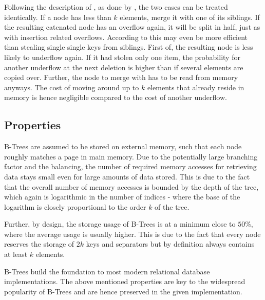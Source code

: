 Following the description of \parencite{DBLP:journals/acta/BayerM72},
as done by \parencite{Fielding80},
the two cases can be treated identically.
If a node has less than $k$ elements,
merge it with one of its siblings.
If the resulting catenated node has an overflow again,
it will be split in half, just as with insertion related overflows.
According to \parencite{DBLP:journals/csur/Comer79} this may even be
more efficient than stealing single single keys from siblings.
First of, the resulting node is less likely to underflow again.
If it had stolen only one item, the probability for another underflow at the next
deletion is higher than if several elements are copied over.
Further, the node to merge with has to be read from memory anyways.
The cost of moving around up to $k$ elements that already reside in memory
is hence negligible compared to the cost of another underflow.


\subsection{Properties}

B-Trees are assumed to be stored on external memory,
such that each node roughly matches a page in main memory.
Due to the potentially large branching factor and the balancing,
the number of required memory accesses for retrieving data stays small even for
large amounts of data stored.
This is due to the fact that the overall number of memory accesses is bounded by the depth
of the tree, which again is logarithmic in the number of indices -
where the base of the logarithm is closely proportional to the order $k$ of the tree.

Further, by design, the storage usage of B-Trees is at a minimum close to $50\%$,
where the average usage is usually higher. \parencite{DBLP:journals/acta/BayerM72}
This is due to the fact that every node reserves the storage of $2k$ keys and separators
but by definition always contains at least $k$ elements.

B-Trees build the foundation to most modern relational database implementations.
The above mentioned properties are key to the widespread popularity of B-Trees and are
hence preserved in the given implementation.

